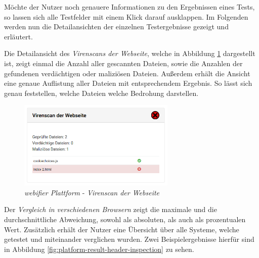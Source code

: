 Möchte der Nutzer noch genauere Informationen zu den Ergebnissen eines Tests, so lassen sich alle Testfelder mit einem Klick darauf ausklappen. Im Folgenden werden nun die Detailansichten der einzelnen Testergebnisse gezeigt und erläutert.

Die Detailansicht des \textit{Virenscans der Webseite}, welche in Abbildung
\ref{fig:platform-result-virusscan} dargestellt ist, zeigt einmal die Anzahl aller gescannten
Dateien, sowie die Anzahlen der gefundenen verdächtigen oder maliziösen Dateien. Außerdem erhält
die Ansicht eine genaue Auflistung aller Dateien mit entsprechendem Ergebnis. So lässt sich genau
feststellen, welche Dateien welche Bedrohung darstellen.

\begin{figure}[H]
  \centering
  \includegraphics[width=7.5cm]{images/platform/virusscan-malicious}
  \caption{\textit{webifier Plattform} - \textit{Virenscan der Webseite}}
  \label{fig:platform-result-virusscan}
\end{figure}

Der \textit{Vergleich in verschiedenen Browsern} zeigt die maximale und die durchschnittliche
Abweichung, sowohl als absoluten, als auch als prozentualen Wert. Zusätzlich erhält der Nutzer eine
Übersicht über alle Systeme, welche getestet und miteinander verglichen wurden. Zwei
Beispielergebnisse hierfür sind in Abbildung \ref{fig:platform-result-header-inspection} zu sehen.

